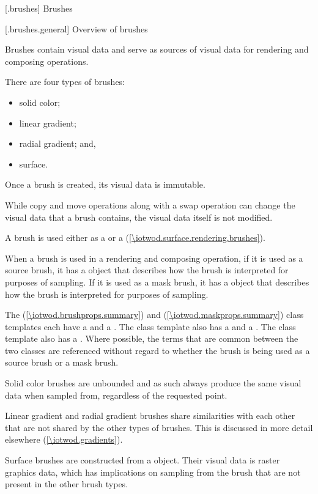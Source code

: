 
 [\iotwod.brushes] {Brushes}

 [\iotwod.brushes.general] {Overview of brushes}

\pnum
Brushes contain visual data and serve as sources of visual data for rendering and composing operations.

\pnum
There are four types of brushes:
\begin{itemize}
	\item solid color;
	\item linear gradient;
	\item radial gradient; and,
	\item surface.
\end{itemize}

\pnum
Once a brush is created, its visual data is immutable.

\pnum
\begin{note}
While copy and move operations along with a swap operation can change the visual data that a brush contains, the visual data itself is not modified.
\end{note}

\pnum
A brush is used either as a  or a  (\ref{\iotwod.surface.rendering.brushes}).

\pnum
When a brush is used in a rendering and composing operation, if it is used as a source brush, it has a  object that describes how the brush is interpreted for purposes of sampling. If it is used as a mask brush, it has a  object that describes how the brush is interpreted for purposes of sampling.

\pnum
The  (\ref{\iotwod.brushprops.summary}) and  (\ref{\iotwod.maskprops.summary}) class templates each have a  and a . The  class template also has a  and a . The  class template also has a . Where possible, the terms that are common between the two classes are referenced without regard to whether the brush is being used as a source brush or a mask brush.

\pnum
Solid color brushes are unbounded and as such always produce the same visual data when sampled from, regardless of the requested point.

\pnum
Linear gradient and radial gradient brushes share similarities with each other that are not shared by the other types of brushes. This is discussed in more detail elsewhere (\ref{\iotwod.gradients}).

\pnum
Surface brushes are constructed from a  object. Their visual data is raster graphics data, which has implications on sampling from the brush that are not present in the other brush types.

\addtocounter{SectionDepthBase}{1}





%

\addtocounter{SectionDepthBase}{-1}
